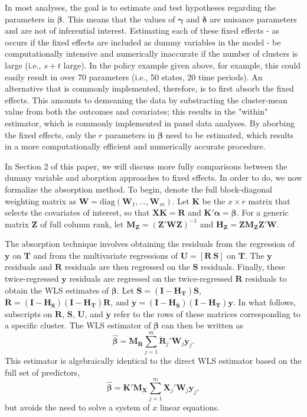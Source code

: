 \documentclass[12pt]{article}
\newcommand{\bm}{\mathbf}
\newcommand{\bs}{\boldsymbol}
\begin{document}
In most analyses, the goal is to estimate and test hypotheses regarding the parameters in $\bs\beta$. 
This means that the values of $\bs\gamma$ and $\bs\delta$ are nuisance parameters and are not of inferential interest. 
Estimating each of these fixed effects - as occurs if the fixed effects are included as dummy variables in the model - be computationally intensive and numerically inaccurate if the number of clusters is large (i.e., $s + t$ large). 
In the policy example given above, for example, this could easily result in over 70 parameters (i.e., 50 states, 20 time periods).
An alternative that is commonly implemented, therefore, is to first absorb the fixed effects. 
This amounts to demeaning the data by substracting the cluster-mean value from both the outcomes and covariates; this results in the "within" estimator, which is commonly implemented in panel data analyses. 
By aborbing the fixed effects, only the $r$ parameters in $\bs\beta$ need to be estimated, which results in a more computationally efficient and numerically accurate procedure. 

In Section 2 of this paper, we will discuss more fully comparisons between the dummy variable and aborption approaches to fixed effects. 
In order to do, we now formalize the absorption method.
To begin, denote the full block-diagonal weighting matrix as $\bm{W} = \text{diag}\left(\bm{W}_1,...,\bm{W}_m\right)$.
Let $\bm{K}$ be the $x \times r$ matrix that selects the covariates of interest, so that $\bm{X} \bm{K} = \bm{R}$ and $\bm{K}'\bs\alpha = \bs\beta$.
For a generic matrix $\bm{Z}$ of full column rank, let $\bm{M_Z} = \left(\bm{Z}'\bm{W}\bm{Z}\right)^{-1}$ and $\bm{H_Z} = \bm{Z}\bm{M_Z}\bm{Z}'\bm{W}$. 

The absorption technique involves obtaining the residuals from the regression of $\bm{y}$ on $\bm{T}$ and from the multivariate regressions of $\bm{U} = [\bm{R}\ \bm{S}]$ on $\bm{T}$. 
The $\bm{y}$ residuals and $\bm{R}$ residuals are then regressed on the $\bm{S}$ residuals. 
Finally, these twice-regressed $\bm{y}$ residuals are regressed on the twice-regressed $\bm{R}$ residuals to obtain the WLS estimates of $\bs\beta$. 
Let $\bm{\ddot{S}} = \left(\bm{I} - \bm{H_T}\right)\bm{S}$, $\bm{\ddot{R}} = \left(\bm{I} - \bm{H_{\ddot{S}}}\right)\left(\bm{I} - \bm{H_T}\right)\bm{R}$, and $\bm{\ddot{y}} = \left(\bm{I} - \bm{H_{\ddot{S}}}\right)\left(\bm{I} - \bm{H_T}\right)\bm{y}$. 
In what follows, subscripts on $\bm{\ddot{R}}$, $\bm{\ddot{S}}$,  $\bm{\ddot{U}}$, and $\bm{\ddot{y}}$ refer to the rows of these matrices corresponding to a specific cluster. 
The WLS estimator of $\bs\beta$ can then be written as
\begin{equation}
\label{eq:WLS}
\bs{\hat\beta} = \bm{M_{\ddot{R}}} \sum_{j=1}^m \bm{\ddot{R}}_j' \bm{W}_j \bm{\ddot{y}}_j. 
\end{equation}
This estimator is algebraically identical to the direct WLS estimator based on the full set of predictors, \[
\bs{\hat\beta} = \bm{K}'\bm{M_X} \sum_{j=1}^m \bm{X}_j' \bm{W}_j \bm{y}_j,
\]
but avoids the need to solve a system of $x$ linear equations.
\end{document}
